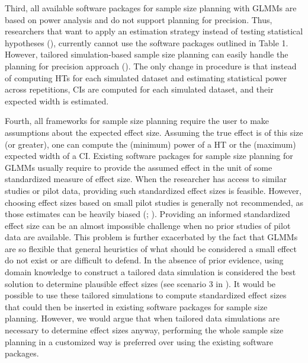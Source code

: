 \documentclass[
  man,
  floatsintext,
  longtable,
  a4paper,
  nolmodern,
  notxfonts,
  notimes,
  colorlinks=true,linkcolor=blue,citecolor=blue,urlcolor=blue]{apa7}
\begin{document}
Third, all available software packages for sample size planning with
GLMMs are based on power analysis and do not support planning for
precision. Thus, researchers that want to apply an estimation strategy
instead of testing statistical hypotheses
(), currently
cannot use the software packages outlined in Table 1. However, tailored
simulation-based sample size planning can easily handle the planning for
precision approach (). The only change in procedure is that instead of
computing HTs for each simulated dataset and estimating statistical
power across repetitions, CIs are computed for each simulated dataset,
and their expected width is estimated.

Fourth, all frameworks for sample size planning require the user to make
assumptions about the expected effect size. Assuming the true effect is
of this size (or greater), one can compute the (minimum) power of a HT
or the (maximum) expected width of a CI. Existing software packages for
sample size planning for GLMMs usually require to provide the assumed
effect in the unit of some standardized measure of effect size. When the
researcher has access to similar studies or pilot data, providing such
standardized effect sizes is feasible. However, choosing effect sizes
based on small pilot studies is generally not recommended, as those
estimates can be heavily biased
(;
).
Providing an informed standardized effect size can be an almost
impossible challenge when no prior studies of pilot data are available.
This problem is further exacerbated by the fact that GLMMs are so
flexible that general heuristics of what should be considered a small
effect do not exist or are difficult to defend. In the absence of prior
evidence, using domain knowledge to construct a tailored data simulation
is considered the best solution to determine plausible effect sizes (see
scenario 3 in ). It would be possible to use these tailored simulations
to compute standardized effect sizes that could then be inserted in
existing software packages for sample size planning. However, we would
argue that when tailored data simulations are necessary to determine
effect sizes anyway, performing the whole sample size planning in a
customized way is preferred over using the existing software packages.
\end{document}
